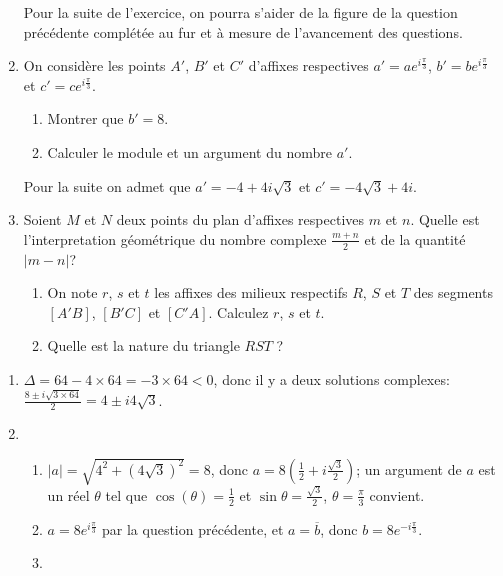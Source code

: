 \documentclass[a4paper,12pt]{exam}
\begin{document}
\begin{questions}
\begin{enumerate}
Pour la suite de l'exercice, on pourra s'aider de la figure de la question précédente complétée au fur
et à mesure de l'avancement des questions.
\item On considère les points $A'$, $B'$ et $C'$ d’affixes respectives $a'=ae^{i\frac\pi3}$, $b'=be^{i\frac\pi3}$ et $c'=ce^{i\frac\pi3}$.
\begin{enumerate}
 \item Montrer que $b'=8$.
 \item Calculer le module et un argument du nombre $a'$.
\end{enumerate}
Pour la suite on admet que $a'=-4+4i\sqrt{3}$ et $c'=-4\sqrt{3}+4i$.
\item Soient $M$ et $N$ deux points du plan d'affixes respectives $m$ et $n$. Quelle est l'interpretation géométrique du nombre complexe $\tfrac{m+n}2$ et de la quantité $|m-n|$?
\begin{enumerate}
 \item On note $r$, $s$ et $t$ les affixes des milieux respectifs $R$, $S$ et $T$ des segments $[A'B]$, $[B'C]$ et $[C'A]$. Calculez $r$, $s$ et $t$.
\item Quelle est la nature du triangle $RST$ ?
\end{enumerate}
\end{enumerate}
\begin{solution}
 \begin{enumerate}
 \item $\Delta=64-4\times64=-3\times64<0$, donc il y a deux solutions complexes: $\tfrac{8\pm i\sqrt{3\times64}}{2}=4\pm i4\sqrt3$.

 \item\ 
 \begin{enumerate}
 \item $|a|=\sqrt{4^2+(4\sqrt3)^2}=8$, donc $a=8(\tfrac12+i\tfrac{\sqrt3}2)$; un argument de $a$ est un réel $\theta$ tel que $\cos(\theta)=\tfrac12$ et $\sin\theta=\tfrac{\sqrt3}2$, $\theta=\tfrac\pi3$ convient.
 \item $a=8e^{i\frac\pi3}$ par la question précédente, et $a=\overline b$, donc $b=8e^{-i\frac\pi3}$.
 \item\ \begin{center}
\end{center}
\end{enumerate}
\end{enumerate}
\end{solution}
\end{questions}
\end{document}
